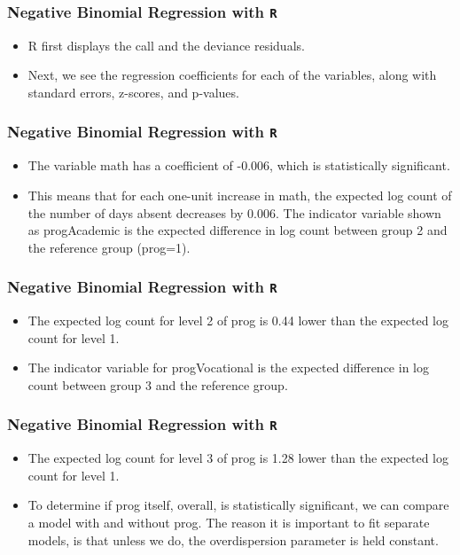 \documentclass[00-GLMregslides.tex]{subfiles}
\begin{document}
\begin{frame}[fragile]
	\frametitle{Negative Binomial Regression with \texttt{R} }
	\Large
	\begin{itemize}
	\item R first displays the call and the deviance residuals. 
	\item Next, we see the regression coefficients for each of the variables, along with standard errors, z-scores, 
	and p-values. 
	\end{itemize}
\end{frame}
\begin{frame}[fragile]
	\frametitle{Negative Binomial Regression with \texttt{R} }
	\Large
	\begin{itemize}
	\item The variable math has a coefficient of -0.006, which is statistically significant.
	\item This means that for each one-unit increase in math, the expected log count of the number of days absent decreases by 0.006. The indicator variable shown as progAcademic is the expected difference in log count between group 2 and the reference group (prog=1). 
	\end{itemize}
\end{frame}
\begin{frame}[fragile]
	\frametitle{Negative Binomial Regression with \texttt{R} }
	\Large
	\begin{itemize}
	\item 
	The expected log count for level 2 of prog is 0.44 lower than the expected log count for level 1. 
	\item The indicator variable for progVocational is the expected difference in log count between group 3 and
	the reference group.
	\end{itemize}
\end{frame}
\begin{frame}[fragile]
	\frametitle{Negative Binomial Regression with \texttt{R} }
	\Large
	\begin{itemize}	
	
	\item The expected log count for level 3 of prog is 1.28 lower than the expected log count for level 1. 
	\item To determine if prog itself, overall, is statistically significant, we can compare a model with and without prog. The reason it is important to fit separate models, is that unless we do, the overdispersion parameter is held constant.
	\end{itemize}
\end{frame}
\end{document}
